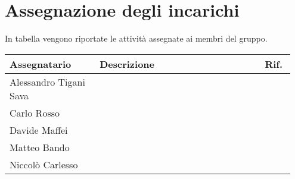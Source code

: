 \section{Assegnazione degli incarichi}
In tabella vengono riportate le attività assegnate ai membri del gruppo.
\begin{center}
	{
		\renewcommand{\arraystretch}{1.5}
		\begin{tabular}{p{0.30\linewidth}|p{0.55\linewidth}|p{0.10\linewidth}}
			\textbf{Assegnatario}        & \textbf{Descrizione} & \textbf{Rif.} \\

			\hline
			Alessandro Tigani Sava       &                      &               \\
			\hline
			\multirow{2}{*}{Carlo Rosso} &                      &               \\
			\cline{2-3}
			                             &                      &               \\
			\hline
			Davide Maffei                &                      &               \\
			\hline
			Matteo Bando                 &                      &               \\
			\hline
			Niccolò Carlesso             &                      &               \\
			\hline
		\end{tabular}
	}
\end{center}
